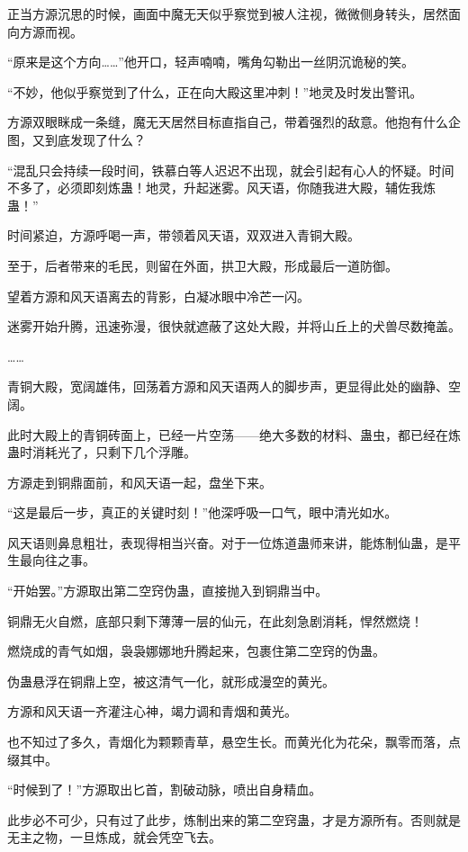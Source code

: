 \begin{this_body}
正当方源沉思的时候，画面中魔无天似乎察觉到被人注视，微微侧身转头，居然面向方源而视。

“原来是这个方向……”他开口，轻声喃喃，嘴角勾勒出一丝阴沉诡秘的笑。

“不妙，他似乎察觉到了什么，正在向大殿这里冲刺！”地灵及时发出警讯。

方源双眼眯成一条缝，魔无天居然目标直指自己，带着强烈的敌意。他抱有什么企图，又到底发现了什么？

“混乱只会持续一段时间，铁慕白等人迟迟不出现，就会引起有心人的怀疑。时间不多了，必须即刻炼蛊！地灵，升起迷雾。风天语，你随我进大殿，辅佐我炼蛊！”

时间紧迫，方源呼喝一声，带领着风天语，双双进入青铜大殿。

至于，后者带来的毛民，则留在外面，拱卫大殿，形成最后一道防御。

望着方源和风天语离去的背影，白凝冰眼中冷芒一闪。

迷雾开始升腾，迅速弥漫，很快就遮蔽了这处大殿，并将山丘上的犬兽尽数掩盖。

……

青铜大殿，宽阔雄伟，回荡着方源和风天语两人的脚步声，更显得此处的幽静、空阔。

此时大殿上的青铜砖面上，已经一片空荡——绝大多数的材料、蛊虫，都已经在炼蛊时消耗光了，只剩下几个浮雕。

方源走到铜鼎面前，和风天语一起，盘坐下来。

“这是最后一步，真正的关键时刻！”他深呼吸一口气，眼中清光如水。

风天语则鼻息粗壮，表现得相当兴奋。对于一位炼道蛊师来讲，能炼制仙蛊，是平生最向往之事。

“开始罢。”方源取出第二空窍伪蛊，直接抛入到铜鼎当中。

铜鼎无火自燃，底部只剩下薄薄一层的仙元，在此刻急剧消耗，悍然燃烧！

燃烧成的青气如烟，袅袅娜娜地升腾起来，包裹住第二空窍的伪蛊。

伪蛊悬浮在铜鼎上空，被这清气一化，就形成漫空的黄光。

方源和风天语一齐灌注心神，竭力调和青烟和黄光。

也不知过了多久，青烟化为颗颗青草，悬空生长。而黄光化为花朵，飘零而落，点缀其中。

“时候到了！”方源取出匕首，割破动脉，喷出自身精血。

此步必不可少，只有过了此步，炼制出来的第二空窍蛊，才是方源所有。否则就是无主之物，一旦炼成，就会凭空飞去。


\end{this_body}
